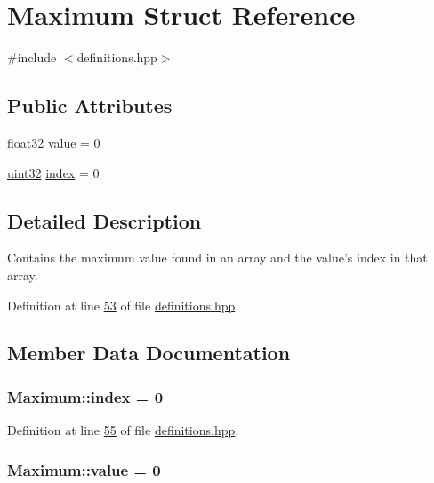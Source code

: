 \hypertarget{structMaximum}{\section{Maximum Struct Reference}
\label{structMaximum}
}


{\ttfamily \#include $<$definitions.\+hpp$>$}

\subsection*{Public Attributes}
\begin{DoxyCompactItemize}
\item 
\hyperlink{definitions_8hpp_aacdc525d6f7bddb3ae95d5c311bd06a1}{float32} \hyperlink{structMaximum_aa7e84cbf37b694670142670014366969}{value} = 0
\item 
\hyperlink{definitions_8hpp_a1134b580f8da4de94ca6b1de4d37975e}{uint32} \hyperlink{structMaximum_a2e6aef03795cd285fe542d0861c6e3b5}{index} = 0
\end{DoxyCompactItemize}


\subsection{Detailed Description}
Contains the maximum value found in an array and the value's index in that array. 

Definition at line \hyperlink{definitions_8hpp_source_l00053}{53} of file \hyperlink{definitions_8hpp_source}{definitions.\+hpp}.



\subsection{Member Data Documentation}
\hypertarget{structMaximum_a2e6aef03795cd285fe542d0861c6e3b5}{
\subsubsection[{index}]{ Maximum\+::index = 0}}\label{structMaximum_a2e6aef03795cd285fe542d0861c6e3b5}


Definition at line \hyperlink{definitions_8hpp_source_l00055}{55} of file \hyperlink{definitions_8hpp_source}{definitions.\+hpp}.

\hypertarget{structMaximum_aa7e84cbf37b694670142670014366969}{
\subsubsection[{value}]{ Maximum\+::value = 0}}\label{structMaximum_aa7e84cbf37b694670142670014366969}


